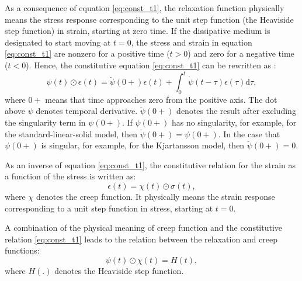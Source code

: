 \documentclass[article]{./macros/elsarticle_qh}
\begin{document}
As a consequence of equation \ref{eq:const_t1}, the relaxation function physically means the stress response corresponding to the unit step function (the Heaviside step function) in strain, starting at zero time. If the dissipative medium is designated to start moving at $t=0$, the stress and strain in equation \ref{eq:const_t1} are nonzero for a positive time ($t>0$) and zero for a negative time ($t<0$). Hence, the constitutive equation \ref{eq:const_t1} can be rewritten as \cite[]{gurtin:1962,hudson:1980,hao.alkhalifah:2019}:
\begin{equation} \label{eq:calconst}
\psi(t) \odot \epsilon(t) = 
\breve{\psi}(0+) \epsilon(t) + \int_{0}^{t} \dot{\psi}(t-\tau) \epsilon(\tau) \text{d}\tau , 
\end{equation}
\noindent where $0+$ means that time approaches zero from the positive axis. The dot above $\psi$ denotes temporal derivative. $\breve{\psi}(0+)$ denotes the result after excluding the singularity term in $\psi(0+)$. 
If $\psi(0+)$ has no singularity, for example, for the standard-linear-solid model, then $\breve{\psi}(0+) = \psi(0+)$. In the case that $\psi(0+)$ is singular, for example, for the Kjartansson model, then $\breve{\psi}(0+) = 0$.

As an inverse of equation \ref{eq:const_t1}, the constitutive relation for the strain as a function of the stress is written as:
\begin{equation} \label{eq:const_t2}
\epsilon(t) = \chi(t) \odot \sigma(t) ,
\end{equation}
where $\chi$ denotes the creep function. It physically means the strain response corresponding to a unit step function in stress, starting at $t=0$. 

A combination of the physical meaning of creep function and the constitutive relation \ref{eq:const_t1} leads to the relation between the relaxation and creep functions:
\begin{equation}
\psi(t) \odot \chi(t) = H(t) ,
\end{equation}
where $H(.)$ denotes the Heaviside step function.
\end{document}
